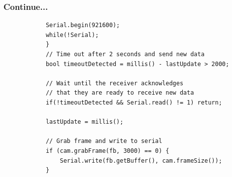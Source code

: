 \documentclass[10pt, a4paper]{beamer}
\begin{document}
	\begin{frame}[fragile]
		\frametitle{Continue...}
		\begin{lstlisting}
			Serial.begin(921600);
			while(!Serial);
			}
			// Time out after 2 seconds and send new data
			bool timeoutDetected = millis() - lastUpdate > 2000;
			
			// Wait until the receiver acknowledges
			// that they are ready to receive new data
			if(!timeoutDetected && Serial.read() != 1) return;
			
			lastUpdate = millis();
			
			// Grab frame and write to serial
			if (cam.grabFrame(fb, 3000) == 0) {
				Serial.write(fb.getBuffer(), cam.frameSize());
			}
		\end{lstlisting}
	\end{frame}
	
\end{document}
